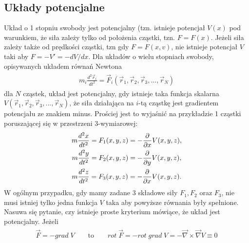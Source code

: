 \documentclass[a4paper,12pt,polish]{sphinxmanual}
\begin{document}
\subsection{Układy potencjalne}
\label{ch1/chI022:uklady-potencjalne}
Układ o 1 stopniu swobody jest  potencjalny (tzn. istnieje potencjał $V(x)$  pod warunkiem, że siła zależy tylko od położenia cząstki, tzn. $F=F(x)$. Jeżeli siła zależy także od prędkości cząstki, tzn gdy $F=F(x, v)$, nie istnieje potencjał $V$ taki aby $F = -V' = - dV/dx$. Dla układów o wielu stopniach swobody, opisywanych układem równań Newtona
\label{ch1/chI022:equation-eqn11}\begin{gather}
\begin{split}m_i \frac{d^2\vec r_i}{dt^2} = \vec F_i(\vec r_1,  \vec r_2, \vec r_3, ..., \vec r_N)\end{split}\label{ch1/chI022-eqn11}
\end{gather}
dla $N$ cząstek, układ jest potencjalny, gdy istnieje taka funkcja skalarna $V(\vec r_1,  \vec r_2, \vec r_3, ..., \vec r_N)$, że siła działająca na $i$-tą cząstkę jest gradientem potencjału ze znakiem minus. Prościej jest to wyjaśnić na przykładzie 1 cząstki poruszającej się w przestrzeni 3-wymiarowej:
\label{ch1/chI022:equation-eqn12}\begin{gather}
\begin{split}m\frac{d^2x}{dt^2} = F_1(x, y, z) = - \frac{\partial}{\partial x} V(x, y, z),\end{split}\label{ch1/chI022-eqn12}\\\begin{split}m\frac{d^2y}{dt^2}   = F_2(x, y, z) = - \frac{\partial}{\partial y} V(x, y, z),\end{split}\notag\\\begin{split}m\frac{d^2z}{dt^2} = F_3(x, y, z) = - \frac{\partial}{\partial x} V(x, y, z).\end{split}\notag
\end{gather}
W ogólnym przypadku, gdy mamy zadane 3 składowe siły $F_1,  F_2$ oraz $F_3$, nie musi istniej tylko jedna funkcja $V$ taka aby powyższe równania były spełnione. Nasuwa się pytanie, czy istnieje proste kryterium mówiące, że układ jest potencjalny. Jeżeli
\label{ch1/chI022:equation-eqn13}\begin{gather}
\begin{split}\vec F = - grad \; V \qquad \mbox{to} \qquad rot\; \vec F = - rot \;grad \;V  =  - \vec \nabla \times \vec \nabla V \equiv 0\end{split}\label{ch1/chI022-eqn13}
\end{gather}
\end{document}

